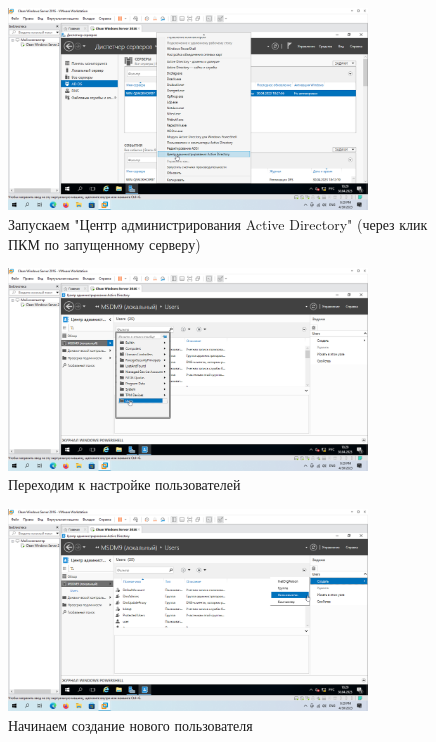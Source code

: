 \documentclass[a4paper]{article}
\begin{document}
  \begin{figure}[H]
    \centering
    \includegraphics[width=0.85\textwidth]{Screenshot_68}
    \caption{Запускаем "Центр администрирования Active Directory" (через клик ПКМ по запущенному серверу)}
    \label{img:68}
  \end{figure}

  \begin{figure}[H]
    \centering
    \includegraphics[width=0.85\textwidth]{Screenshot_69}
    \caption{Переходим к настройке пользователей}
    \label{img:69}
  \end{figure}

  \begin{figure}[H]
    \centering
    \includegraphics[width=0.85\textwidth]{Screenshot_71}
    \caption{Начинаем создание нового пользователя}
    \label{img:71}
  \end{figure}
\end{document}
